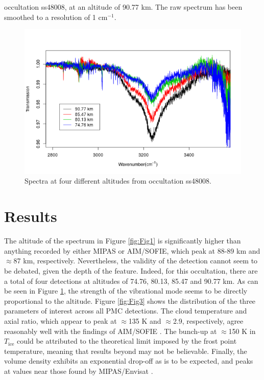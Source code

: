 \documentclass[]{elsarticle}
\begin{document}
occultation ss48008, at an altitude of 90.77 km. The raw spectrum has been smoothed to a resolution of 1 cm$^{-1}$. 

\begin{figure}
	\includegraphics{figs/ss48008_all}
	\caption{Spectra at four different altitudes from occultation ss48008.}
	\label{fig:Fig2}
\end{figure}


\section{Results} \label{sec:results}
The altitude of the spectrum in Figure \ref{fig:Fig1} is significantly higher than anything recorded by either MIPAS or AIM/SOFIE, which peak at 88-89 km and $\approx$87 km, respectively. Nevertheless, the validity of the detection cannot seem to be debated, given the depth of the feature. Indeed, for this occultation, there are a total of four detections at altitudes of 74.76, 80.13, 85.47 and 90.77 km. As can be seen in Figure \ref{fig:Fig2}, the strength of the vibrational mode seems to be directly proportional to the altitude.
Figure \ref{fig:Fig3} shows the distribution of the three parameters of interest across all PMC detections. The cloud temperature and axial ratio, which appear to peak at $\approx$135 K and $\approx$2.9, respectively, agree reasonably well with the findings of AIM/SOFIE \cite{Hervig2010}. The bunch-up at $\approx$150 K in $T_{\text{ice}}$ could be attributed to the theoretical limit imposed by the frost point temperature, meaning that results beyond may not be believable. Finally, the volume density exhibits an exponential drop-off as is to be expected, and peaks at values near those found by MIPAS/Envisat \cite{Garcia-Comas2016}.  
\end{document}
